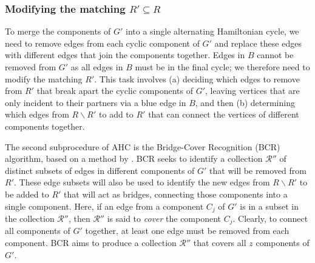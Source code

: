 \documentclass[a4paper,11pt,authoryear]{elsarticle}
\begin{document}

\subsubsection{Modifying the matching $R' \subseteq R$}
\label{subsub:bcr}

\noindent To merge the components of $G'$ into a single alternating Hamiltonian cycle, we need to remove edges from each cyclic component of $G'$ and replace these edges with different edges that join the components together. Edges in $B$ cannot be removed from $G'$ as all edges in $B$ must be in the final cycle; we therefore need to modify the matching $R'$. This task involves (a) deciding which edges to remove from $R'$ that break apart the cyclic components of $G'$, leaving vertices that are only incident to their partners via a blue edge in $B$, and then (b) determining which edges from $R\backslash R'$ to add to $R'$ that can connect the vertices of different components together.

The second subprocedure of AHC is the Bridge-Cover Recognition (BCR) algorithm, based on a method by \cite{becker2010}. BCR seeks to identify a collection $\mathcal{R}''$ of distinct subsets of edges in different components of $G'$ that will be removed from $R'$. These edge subsets will also be used to identify the new edges from $R \backslash R'$ to be added to $R'$ that will act as bridges, connecting those components into a single component. Here, if an edge from a component $C_j$ of $G'$ is in a subset in the collection $\mathcal{R}''$, then $\mathcal{R}''$ is said to \emph{cover} the component $C_j$. Clearly, to connect all components of $G'$ together, at least one edge must be removed from each component. BCR aims to produce a collection $\mathcal{R}''$ that covers all $z$ components of $G'$. %

\end{document}
